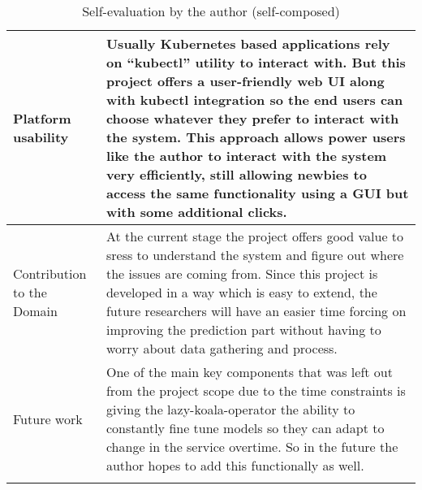 \begin{longtable}{|p{35mm}|p{125mm}|}
  Platform usability &
    Usually Kubernetes based applications rely on “kubectl” utility to interact with. But this project offers a user-friendly web UI along with kubectl integration so the end users can choose whatever they prefer to interact with the system. This approach allows power users like the author to interact with the system very efficiently, still allowing newbies to access the same functionality using a GUI but with some additional clicks. \\ \hline
  Contribution to the Domain &
    At the current stage the project offers good value to \acp{sres} to understand the system and figure out where the issues are coming from. Since this project is developed in a way which is easy to extend, the future researchers will have an easier time forcing on improving the prediction part without having to worry about data gathering and process. \\ \hline
  Future work &
    One of the main key components that was left out from the project scope due to the time constraints is giving the \ac{lazy-koala-operator}  the ability to constantly fine tune models so they can adapt to change in the service overtime. So in the future the author hopes to add this functionally as well. \\ \hline
  
    \caption{Self-evaluation by the author (self-composed)}
\end{longtable}